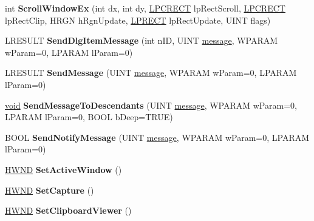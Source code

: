 \begin{DoxyCompactItemize}
\mbox{\label{class_a_t_l_1_1_c_window_a0ea806f37fe1e1474b8bd700c6709e9d}} 
int {\bfseries Scroll\+Window\+Ex} (int dx, int dy, \hyperlink{structtag_r_e_c_t}{L\+P\+C\+R\+E\+CT} lp\+Rect\+Scroll, \hyperlink{structtag_r_e_c_t}{L\+P\+C\+R\+E\+CT} lp\+Rect\+Clip, H\+R\+GN h\+Rgn\+Update, \hyperlink{structtag_r_e_c_t}{L\+P\+R\+E\+CT} lp\+Rect\+Update, U\+I\+NT flags)
\item 
\mbox{\label{class_a_t_l_1_1_c_window_a4122f4d867c19a1d01b4ad70b7a2c918}} 
L\+R\+E\+S\+U\+LT {\bfseries Send\+Dlg\+Item\+Message} (int n\+ID, U\+I\+NT \hyperlink{structmessage}{message}, W\+P\+A\+R\+AM w\+Param=0, L\+P\+A\+R\+AM l\+Param=0)
\item 
\mbox{\label{class_a_t_l_1_1_c_window_a51880c536a3b9c025be42ea1851d9b0a}} 
L\+R\+E\+S\+U\+LT {\bfseries Send\+Message} (U\+I\+NT \hyperlink{structmessage}{message}, W\+P\+A\+R\+AM w\+Param=0, L\+P\+A\+R\+AM l\+Param=0)
\item 
\mbox{\label{class_a_t_l_1_1_c_window_a0d07af847d5d4442244fa7d635e902fe}} 
\hyperlink{interfacevoid}{void} {\bfseries Send\+Message\+To\+Descendants} (U\+I\+NT \hyperlink{structmessage}{message}, W\+P\+A\+R\+AM w\+Param=0, L\+P\+A\+R\+AM l\+Param=0, B\+O\+OL b\+Deep=T\+R\+UE)
\item 
\mbox{\label{class_a_t_l_1_1_c_window_a66e9294741d245dd7f56444fe733946b}} 
B\+O\+OL {\bfseries Send\+Notify\+Message} (U\+I\+NT \hyperlink{structmessage}{message}, W\+P\+A\+R\+AM w\+Param=0, L\+P\+A\+R\+AM l\+Param=0)
\item 
\mbox{\label{class_a_t_l_1_1_c_window_a503873996946aa95b14718960351270b}} 
\hyperlink{interfacevoid}{H\+W\+ND} {\bfseries Set\+Active\+Window} ()
\item 
\mbox{\label{class_a_t_l_1_1_c_window_a9b37477c601478f648e1512663850416}} 
\hyperlink{interfacevoid}{H\+W\+ND} {\bfseries Set\+Capture} ()
\item 
\mbox{\label{class_a_t_l_1_1_c_window_a03bb16f2eec33761fbefbb5289418d42}} 
\hyperlink{interfacevoid}{H\+W\+ND} {\bfseries Set\+Clipboard\+Viewer} ()

\end{DoxyCompactItemize}
